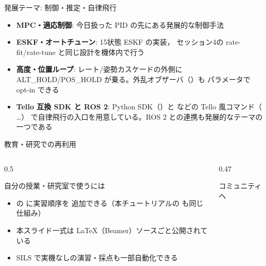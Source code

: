 \begin{frame}{発展テーマ: 制御・推定・自律飛行\later}
  \begin{itemize}\small
    \item \textbf{MPC・適応制御}: 今日扱った PID の先にある発展的な制御手法
    \item \textbf{ESKF・オートチューン}: 15状態 ESKF の実装，
          セッション4の rate-fit/rate-tune と同じ設計を機体内で行う 
    \item \textbf{高度・位置ループ}: レート/姿勢カスケードの外側に
          ALT\_HOLD/POS\_HOLD が乗る。外乱オブザーバ（）も
          パラメータで opt-in できる
    \item \textbf{Tello 互換 SDK と ROS 2}: Python SDK（）と
           などの Tello 風コマンド（ …）
          で自律飛行の入口を用意している。ROS 2 との連携も発展的なテーマの一つである
  \end{itemize}
\end{frame}

\newlength{\communityCardH}\setlength{\communityCardH}{4.35cm}
\begin{frame}{教育・研究での再利用\later}
  \begin{columns}[T]
    \begin{column}{0.5\textwidth}
      \begin{block}{自分の授業・研究室で使うには}\footnotesize
        \begin{itemize}
          \setlength{\itemsep}{1pt}
          \item {} の  に実習順序を
                追加できる（本チュートリアルの  も同じ仕組み）
          \item 本スライド一式は LaTeX（Beamer）ソースごと公開されている
          \item SILS で実機なしの演習・採点も一部自動化できる
        \end{itemize}
      \end{block}
    \end{column}
    \begin{column}{0.47\textwidth}
      \begin{exampleblock}{コミュニティへ}\footnotesize
      \end{exampleblock}
    \end{column}
  \end{columns}
\end{frame}

